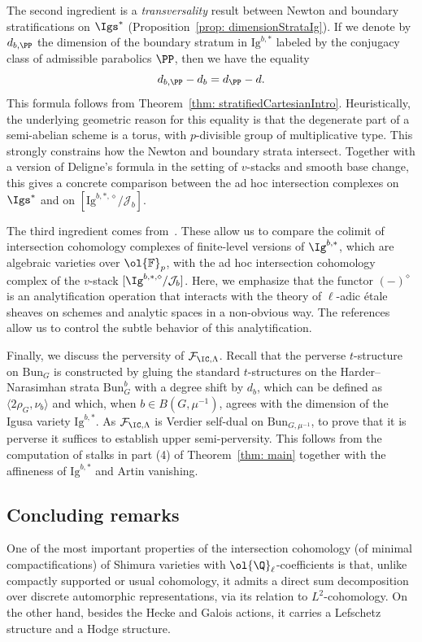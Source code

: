\documentclass[letterpaper,11pt]{amsart}
\begin{document}
The second ingredient is a \emph{transversality} result between Newton and boundary stratifications on $\Igs^*$ (Proposition~\ref{prop: dimensionStrataIg}). If we denote by $d_{b,\PP}$ the dimension of the boundary stratum in $\mathrm{Ig}^{b,*}$ labeled by the conjugacy class of admissible parabolics $\PP$, then we have the equality 
\[
d_{b,\PP} - d_b = d_{\PP} - d. 
\]
This formula follows from Theorem~\ref{thm: stratifiedCartesianIntro}. Heuristically, the underlying geometric reason for this equality is that the degenerate part of a semi-abelian scheme is a torus, with $p$-divisible group of multiplicative type. This strongly
constrains how the Newton and boundary strata intersect. Together with a version of Deligne's formula in the setting of $v$-stacks and smooth base change, this gives a concrete comparison between the ad hoc intersection complexes on $\Igs^*$ and on $[\mathrm{Ig}^{b,*,\diamond}/\mathcal{J}_b]$. 

The third ingredient comes from~\cite{GleasonTubularNeighborhoods, GHILZIsocComparison}. These allow us to compare the colimit of intersection cohomology complexes of finite-level versions of $\Ig^{b,*}$, which are algebraic varieties over $\ol{\mathbb{F}}_p$, with the ad hoc intersection cohomology complex of the $v$-stack $[\Ig^{b,*,\diamond}/\mathcal{J}_b]$. Here, we emphasize that the functor $(-)^{\diamond}$ is an analytification operation that interacts with the theory of $\ell$-adic \'etale sheaves on schemes and analytic spaces in a non-obvious way. The references \cite{GleasonTubularNeighborhoods, GHILZIsocComparison} allow us to control the subtle behavior of this analytification.

Finally, we discuss the perversity of $\mathcal{F}_{\IC,\Lambda}$. Recall that the perverse $t$-structure on $\mathrm{Bun}_G$ is constructed by gluing the standard $t$-structures on the Harder--Narasimhan strata 
$\mathrm{Bun}^b_G$ with a degree shift by $d_b$, which can be defined as $\langle 2\rho_{G},\nu_{b} \rangle$ and which, when $b\in B(G,\mu^{-1})$, agrees with the dimension of the Igusa variety $\mathrm{Ig}^{b,*}$. As $\mathcal{F}_{\IC,\Lambda}$ is Verdier self-dual on $\mathrm{Bun}_{G,\mu^{-1}}$, to prove that it is perverse it suffices to establish upper semi-perversity. This follows from the computation of stalks in part (4) of Theorem~\ref{thm: main} together with the affineness of $\mathrm{Ig}^{b,*}$ and Artin vanishing. 

\subsection{Concluding remarks}
One of the most important properties of the intersection cohomology (of minimal compactifications) of Shimura varieties with $\ol{\Q}_\ell$-coefficients is that, unlike compactly supported or usual cohomology, it admits a direct sum decomposition over discrete automorphic representations, via its relation to $L^2$-cohomology. On the other hand, besides the Hecke and Galois actions, it carries a Lefschetz structure and a Hodge structure. 
\end{document}
